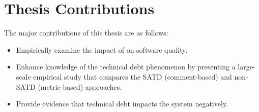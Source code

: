 \section{Thesis Contributions}
The major contributions of this thesis are as follows:
\begin{itemize}
	\item Empirically examine the impact of \SATD on software quality.
	\item Enhance knowledge of the technical debt phenomenon by presenting a large-scale empirical study that compares the SATD (comment-based) and non-SATD (metric-based) approaches.
	\item Provide evidence that technical debt impacts the system negatively.


\end{itemize}